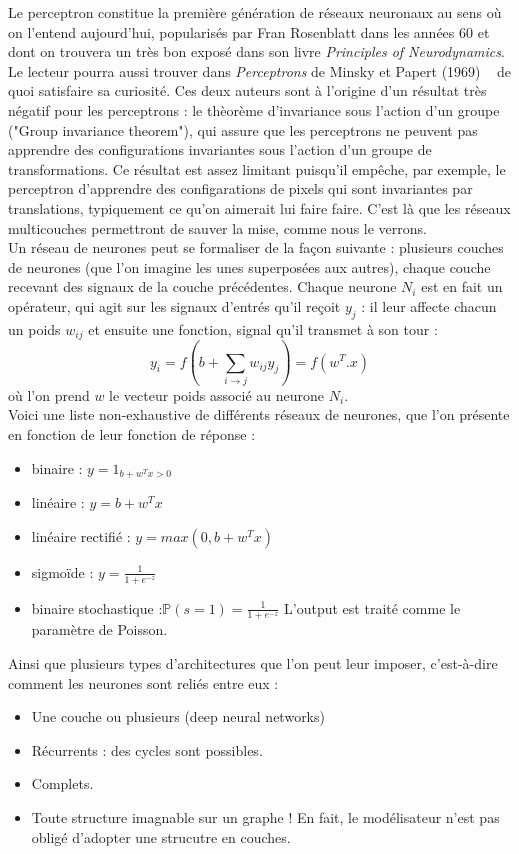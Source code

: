 \documentclass{article}
\theoremstyle{definition}
\begin{document}
Le perceptron constitue la première génération de réseaux neuronaux au sens où on l'entend aujourd'hui, popularisés par Fran Rosenblatt dans les années 60 et dont on trouvera un très bon exposé dans son livre \textit{Principles of Neurodynamics}.~\cite{Rosenblatt}\\

Le lecteur pourra aussi trouver dans \textit{Perceptrons} de Minsky et Papert (1969) ~\cite{MinskyPapert} de quoi satisfaire sa curiosité. Ces deux auteurs sont à l'origine d'un résultat très négatif pour les perceptrons : le thèorème d'invariance sous l'action d'un groupe ("Group invariance theorem"), qui assure que les perceptrons ne peuvent pas apprendre des configurations invariantes sous l'action d'un groupe de transformations. Ce résultat est assez limitant puisqu'il empêche, par exemple, le perceptron d'apprendre des configarations de pixels qui sont invariantes par translations, typiquement ce qu'on aimerait lui faire faire. C'est là que les réseaux multicouches permettront de sauver la mise, comme nous le verrons.\\

Un réseau de neurones peut se formaliser de la façon suivante : plusieurs couches de neurones (que l'on imagine les unes superposées aux autres), chaque couche recevant des signaux de la couche précédentes. Chaque neurone $N_i$ est en fait un opérateur, qui agit sur les signaux d'entrés qu'il reçoit $y_j$ : il leur affecte chacun un poids $w_{ij}$ et ensuite une fonction, signal qu'il transmet à son tour :
\[y_i=f(b+\sum_{i\rightarrow j}w_{ij}y_j)=f(w^T.x)\]
où l'on prend $w$ le vecteur poids associé au neurone $N_i$.\\

Voici une liste non-exhaustive de différents réseaux de neurones, que l'on présente en fonction de leur fonction de réponse :
\begin{itemize}
\item binaire : $y=1_{b+w^Tx>0}$
\item linéaire : $y=b+w^Tx$
\item linéaire rectifié : $y=max(0,b+w^Tx)$
\item sigmoïde : $y=\frac{1}{1+e^{-z}}$
\item binaire stochastique :$\mathbb P(s=1)=\frac{1}{1+e^{-z}}$ L'output est traité comme le paramètre de Poisson.\\
\end{itemize}

Ainsi que plusieurs types d'architectures que l'on peut leur imposer, c'est-à-dire comment les neurones sont reliés entre eux :
\begin{itemize}
\item Une couche ou plusieurs (deep neural networks)
\item Récurrents : des cycles sont possibles.
\item Complets.
\item Toute structure imagnable sur un graphe ! En fait, le modélisateur n'est pas obligé d'adopter une strucutre en couches.\\
\end{itemize}
\end{document}
